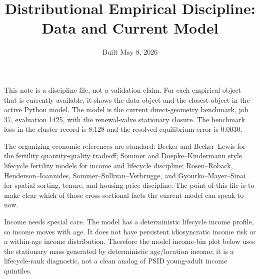 \documentclass[11pt]{article}
\title{Distributional Empirical Discipline: Data and Current Model}
\author{}
\date{Built May 8, 2026}
\begin{document}
\maketitle

\noindent This note is a discipline file, not a validation claim. For each empirical object that is currently available, it shows the data object and the closest object in the active Python model. The model is the current direct-geometry benchmark, job 37, evaluation 1425, with the renewal-valve stationary closure. The benchmark loss in the cluster record is 8.128 and the resolved equilibrium error is 0.0030.

\medskip
\noindent The organizing economic references are standard: Becker and Becker--Lewis for the fertility quantity-quality tradeoff; Sommer and Doepke--Kindermann style lifecycle fertility models for income and lifecycle discipline; Rosen--Roback, Henderson--Ioannides, Sommer--Sullivan--Verbrugge, and Gyourko--Mayer--Sinai for spatial sorting, tenure, and housing-price discipline. The point of this file is to make clear which of those cross-sectional facts the current model can speak to now.

\medskip
\noindent Income needs special care. The model has a deterministic lifecycle income profile, so income moves with age. It does not have persistent idiosyncratic income risk or a within-age income distribution. Therefore the model income-bin plot below uses the stationary mass generated by deterministic age/location income; it is a lifecycle-rank diagnostic, not a clean analog of PSID young-adult income quintiles.
\end{document}
